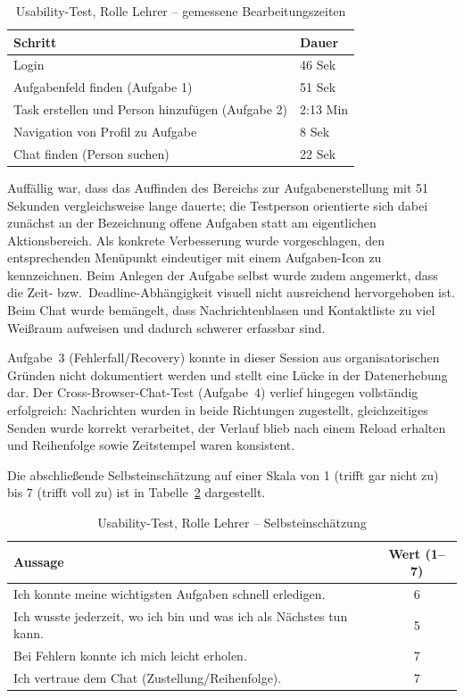\begin{table}[H]
    \centering
    \caption{Usability-Test, Rolle Lehrer -- gemessene Bearbeitungszeiten}
    \label{tab:usability_lehrer}
    \begin{tabularx}{\textwidth}{lX}
        \toprule
        \textbf{Schritt} & \textbf{Dauer} \\
        \midrule
        Login & 46 Sek \\
        Aufgabenfeld finden (Aufgabe 1) & 51 Sek \\
        Task erstellen und Person hinzufügen (Aufgabe 2) & 2:13 Min \\
        Navigation von Profil zu Aufgabe & 8 Sek \\
        Chat finden (Person suchen) & 22 Sek \\
        \bottomrule
    \end{tabularx}
\end{table}

Auffällig war, dass das Auffinden des Bereichs zur Aufgabenerstellung mit 51 Sekunden vergleichsweise lange dauerte; die Testperson orientierte sich dabei zunächst an der Bezeichnung \glqq{}offene Aufgaben\grqq{} statt am eigentlichen Aktionsbereich. Als konkrete Verbesserung wurde vorgeschlagen, den entsprechenden Menüpunkt eindeutiger mit einem Aufgaben-Icon zu kennzeichnen. Beim Anlegen der Aufgabe selbst wurde zudem angemerkt, dass die Zeit- bzw.\ Deadline-Abhängigkeit visuell nicht ausreichend hervorgehoben ist. Beim Chat wurde bemängelt, dass Nachrichtenblasen und Kontaktliste zu viel Weißraum aufweisen und dadurch schwerer erfassbar sind.

Aufgabe~3 (Fehlerfall/Recovery) konnte in dieser Session aus organisatorischen Gründen nicht dokumentiert werden und stellt eine Lücke in der Datenerhebung dar. Der Cross-Browser-Chat-Test (Aufgabe~4) verlief hingegen vollständig erfolgreich: Nachrichten wurden in beide Richtungen zugestellt, gleichzeitiges Senden wurde korrekt verarbeitet, der Verlauf blieb nach einem Reload erhalten und Reihenfolge sowie Zeitstempel waren konsistent.

Die abschließende Selbsteinschätzung auf einer Skala von 1 (trifft gar nicht zu) bis 7 (trifft voll zu) ist in Tabelle~\ref{tab:usability_lehrer_skala} dargestellt.

\begin{table}[H]
    \centering
    \caption{Usability-Test, Rolle Lehrer -- Selbsteinschätzung}
    \label{tab:usability_lehrer_skala}
    \begin{tabularx}{\textwidth}{Xc}
        \toprule
        \textbf{Aussage} & \textbf{Wert (1--7)} \\
        \midrule
        Ich konnte meine wichtigsten Aufgaben schnell erledigen. & 6 \\
        Ich wusste jederzeit, wo ich bin und was ich als Nächstes tun kann. & 5 \\
        Bei Fehlern konnte ich mich leicht erholen. & 7 \\
        Ich vertraue dem Chat (Zustellung/Reihenfolge). & 7 \\
        \bottomrule
    \end{tabularx}
\end{table}

